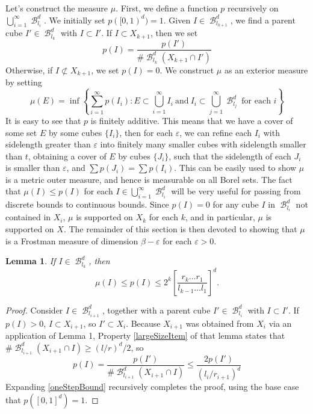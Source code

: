 \documentclass[dvipsnames,letterpaper,12pt]{article}
\numberwithin{equation}{section}
\theoremstyle{plain}
\newtheorem{lemma}{Lemma}
\DeclareMathOperator{\B}{\mathcal{B}}
\begin{document}
Let's construct the measure $\mu$. First, we define a function $p$ recursively on $\bigcup_{i = 1}^\infty \B^d_{l_i}$. We initially set $p([0,1)^d) = 1$. Given $I \in \B^d_{l_{k+1}}$, we find a parent cube $I' \in \B^d_{l_k}$ with $I \subset I'$. If $I \subset X_{k+1}$, then we set
%
\[ p(I) = \frac{p(I')}{\# \B^d_{l_k}(X_{k+1} \cap I')} \]
%
Otherwise, if $I \not \subset X_{k+1}$, we set $p(I) = 0$. We construct $\mu$ as an exterior measure by setting
%
\[ \mu(E) = \inf \left\{ \sum_{i = 1}^\infty p(I_i): E \subset \bigcup_{i = 1}^\infty I_i\ \text{and}\ I_i \subset \bigcup_{j = 1}^\infty \B^d_{l_j}\ \text{for each $i$}  \right\} \]
%
It is easy to see that $p$ is finitely additive. This means that we have a cover of some set $E$ by some cubes $\{ I_i \}$, then for each $\varepsilon$, we can refine each $I_i$ with sidelength greater than $\varepsilon$ into finitely many smaller cubes with sidelength smaller than $t$, obtaining a cover of $E$ by cubes $\{ J_i \}$, such that the sidelength of each $J_i$ is smaller than $\varepsilon$, and $\sum p(J_i) = \sum p(I_i)$. This can be easily used to show $\mu$ is a metric outer measure, and hence is measurable on all Borel sets. The fact that $\mu(I) \leq p(I)$ for each $I \in \bigcup_{i = 1}^\infty \B^d_{l_i}$ will be very useful for passing from discrete bounds to continuous bounds. Since $p(I) = 0$ for any cube $I$ in $\B^d_{l_i}$ not contained in $X_i$, $\mu$ is supported on $X_k$ for each $k$, and in particular, $\mu$ is supported on $X$. The remainder of this section is then devoted to showing that $\mu$ is a Frostman measure of dimension $\beta - \varepsilon$ for each $\varepsilon > 0$.

\begin{lemma} \label{mubound}
	If $I \in \B^d_{l_k}$, then
	\begin{equation}
		\mu(I) \leq p(I) \leq 2^k \left[ \frac{r_k \dots r_1}{l_{k-1} \dots l_1} \right]^d.
	\end{equation}
\end{lemma}
\begin{proof}
	Consider $I \in \B^d_{l_{i+1}}$, together with a parent cube $I' \in \B^d_{l_i}$ with $I \subset I'$. If $p(I) > 0$, $I \subset X_{i+1}$, so $I' \subset X_i$. Because $X_{i+1}$ was obtained from $X_i$ via an application of Lemma 1, Property \ref{largeSizeItem} of that lemma states that $\# \B^d_{l_{i+1}}(X_{i+1} \cap I) \geq (l/r)^d/2$, so
	\begin{equation} \label{oneStepBound}
		p(I) = \frac{p(I')}{\# \B^d_{l_{i+1}}(X_{i+1} \cap I)} \leq \frac{2 p(I')}{(l_i/r_{i+1})^d}
	\end{equation}
	Expanding \eqref{oneStepBound} recursively completes the proof, using the base case that $p([0,1]^d) = 1$.
\end{proof}
\end{document}
